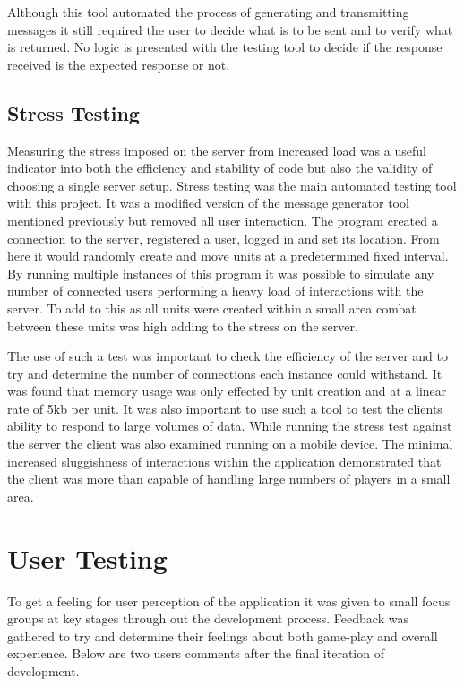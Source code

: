 Although this tool automated the process of generating and transmitting messages it still required the user to decide what is to be sent and to verify what is returned. No logic is presented with the testing tool to decide if the response received is the expected response or not.

\subsection{Stress Testing}
Measuring the stress imposed on the server from increased load was a useful indicator into both the efficiency and stability of code but also the validity of choosing a single server setup. Stress testing was the main automated testing tool with this project. It was a modified version of the message generator tool mentioned previously but removed all user interaction. The program created a connection to the server, registered a user, logged in and set its location. From here it would randomly create and move units at a predetermined fixed interval. By running multiple instances of this program it was possible to simulate any number of connected users performing a heavy load of interactions with the server. To add to this as all units were created within a small area combat between these units was high adding to the stress on the server.

The use of such a test was important to check the efficiency of the server and to try and determine the number of connections each instance could withstand. It was found that memory usage was only effected by unit creation and at a linear rate of 5kb per unit. It was also important to use such a tool to test the clients ability to respond to large volumes of data. While running the stress test against the server the client was also examined running on a mobile device. The minimal increased sluggishness of interactions within the application demonstrated that the client was more than capable of handling large numbers of players in a small area.


\section{User Testing}
To get a feeling for user perception of the application it was given to small focus groups at key stages through out the development process. Feedback was gathered to try and determine their feelings about both game-play and overall experience. Below are two users comments after the final iteration of development.

